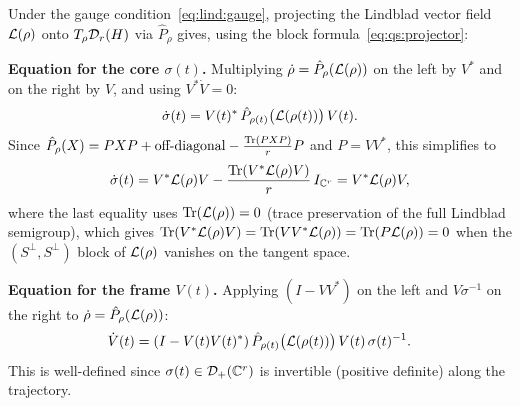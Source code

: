 Under the gauge condition~\eqref{eq:lind:gauge}, projecting the
Lindblad vector field $\mathcal{L}(\rho)$ onto $T_\rho \mathcal{D}_{r}(H)$ via
$\hat{P}_\rho$ gives, using the block formula~\eqref{eq:qs:projector}:

\medskip
\noindent\textbf{Equation for the core $\sigma(t)$.}
Multiplying $\dot\rho = \hat{P}_\rho(\mathcal{L}(\rho))$ on the left by $V^*$
and on the right by $V$, and using $V^*\dot{V} = 0$:
\begin{equation}
\label{eq:lind:core_eq}
    \dot\sigma(t) = V(t)^*\, \hat{P}_{\rho(t)}\bigl(\mathcal{L}(\rho(t))\bigr)\, V(t).
\end{equation}
Since $\hat{P}_\rho(X) = PXP + \text{off-diagonal} - \frac{\mathrm{Tr}(PXP)}{r}P$
and $P = VV^*$, this simplifies to
\begin{equation}
\label{eq:lind:core_explicit}
    \dot\sigma(t)
    = V^* \mathcal{L}(\rho) V
    - \frac{\mathrm{Tr}(V^* \mathcal{L}(\rho) V)}{r}\, I_{\mathbb{C}^r}
    = V^* \mathcal{L}(\rho) V,
\end{equation}
where the last equality uses $\mathrm{Tr}(\mathcal{L}(\rho)) = 0$ (trace preservation
of the full Lindblad semigroup), which gives $\mathrm{Tr}(V^*\mathcal{L}(\rho)V) =
\mathrm{Tr}(VV^*\mathcal{L}(\rho)) = \mathrm{Tr}(P\mathcal{L}(\rho)) = 0$ when the $(S^\perp,S^\perp)$
block of $\mathcal{L}(\rho)$ vanishes on the tangent space.

\medskip
\noindent\textbf{Equation for the frame $V(t)$.}
Applying $(I - VV^*)$ on the left and $V\sigma^{-1}$ on the right to
$\dot\rho = \hat{P}_\rho(\mathcal{L}(\rho))$:
\begin{equation}
\label{eq:lind:frame_eq}
    \dot{V}(t)
    = (I - V(t)V(t)^*)\,
    \hat{P}_{\rho(t)}\bigl(\mathcal{L}(\rho(t))\bigr)\,
    V(t)\, \sigma(t)^{-1}.
\end{equation}
This is well-defined since $\sigma(t) \in \mathcal{D}_+(\mathbb{C}^r)$ is invertible
(positive definite) along the trajectory.

